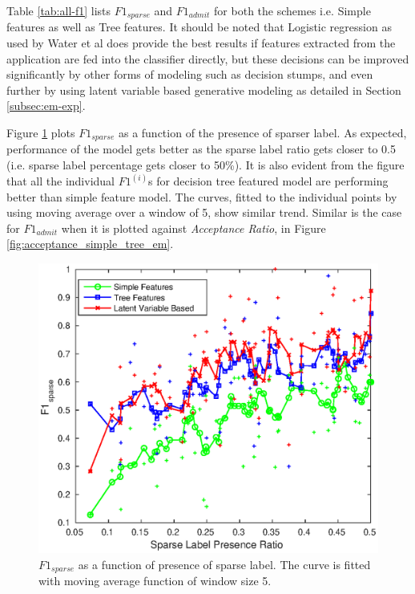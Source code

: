 \documentclass{sig-alternate-05-2015}
\begin{document}
Table \ref{tab:all-f1} lists $F1_{sparse}$ and $F1_{admit}$ for both the schemes i.e. Simple features as well as Tree features. It should be noted that Logistic regression as used by Water et al \cite{waters:iaai13} does provide the best results if features extracted from the application are fed into the classifier directly, but these decisions can be improved significantly by other forms of modeling such as decision stumps, and even further by using latent variable based generative modeling as detailed in Section \ref{subsec:em-exp}.

Figure \ref{fig:sparse_simple_tree_em} plots $F1_{sparse}$ as a function of the presence of sparser label. As expected, performance of the model gets better as the sparse label ratio gets closer to 0.5 (i.e. sparse label percentage gets closer to 50\%). It is also evident from the figure that all the individual $F1^{(i)}$s for decision tree featured model are performing better than simple feature model. The curves, fitted to the individual points by using moving average over a window of 5, show similar trend. Similar is the case for $F1_{admit}$ when it is plotted against \textit{Acceptance Ratio}, in Figure \ref{fig:acceptance_simple_tree_em}.


\begin{figure}[h]
\centering
\includegraphics[scale=0.55]{sparse_label_vs_simple_tree_em.eps}
\caption{$F1_{sparse}$ as a function of presence of sparse label.
The curve is fitted with moving average function of window size 5.}
\label{fig:sparse_simple_tree_em}
\end{figure}
\end{document}
